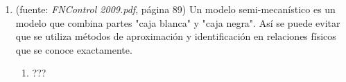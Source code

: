 \documentclass[10pt,onecolumn,twoside,letterpaper]{article}
\begin{document}
\begin{enumerate}
\item (fuente: \textit{FNControl 2009.pdf}, página 89) Un modelo semi-mecanístico es un modelo que combina partes "caja blanca" y "caja negra". Así se puede evitar que se utiliza métodos de aproximación y identificación en relaciones físicos que se conoce exactamente.
  \begin{enumerate}
  \item ???
  \end{enumerate}
\end{enumerate}
\end{document}
